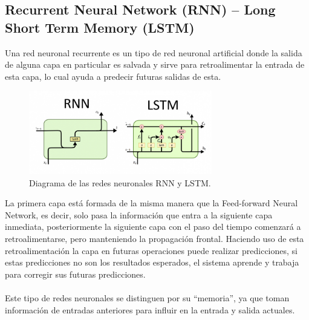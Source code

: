 \subsection{Recurrent Neural Network (RNN) – Long Short Term Memory (LSTM)}
Una red neuronal recurrente es un tipo de red neuronal artificial donde la salida de alguna capa en particular es salvada y sirve para retroalimentar la entrada de esta capa, lo cual ayuda a predecir futuras salidas de esta.
\begin{figure}[h]
	\centering
	\includegraphics[width=8cm]{figuras/RnnLstm.png}
	\caption{Diagrama de las redes neuronales RNN y LSTM.}
	\label{fig:Diagrama de las redes neuronales RNN y LSTM}
\end{figure}
La primera capa está formada de la misma manera que la Feed-forward Neural Network, es decir, solo pasa la información que entra a la siguiente capa inmediata, posteriormente la siguiente capa con el paso del tiempo comenzará a retroalimentarse, pero manteniendo la propagación frontal. Haciendo uso de esta retroalimentación la capa en futuras operaciones puede realizar predicciones, si estas predicciones no son los resultados esperados, el sistema aprende y trabaja para corregir sus futuras predicciones.\cite{redneurnn}\\\\
Este tipo de redes neuronales se distinguen por su “memoria”, ya que toman información de entradas anteriores para influir en la entrada y salida actuales.

